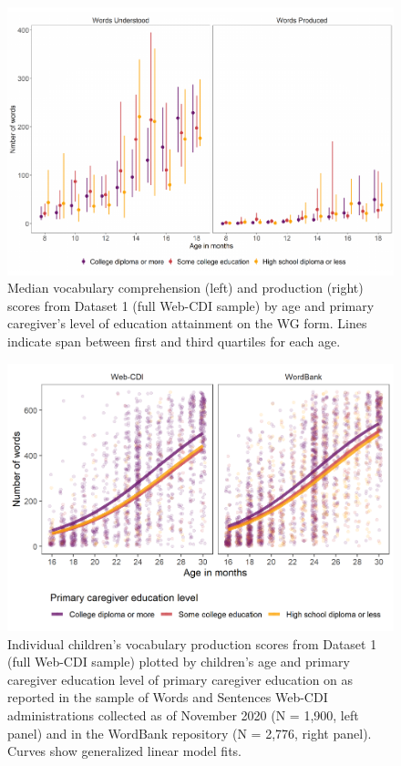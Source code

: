\documentclass[
  english,
  ,man,floatsintext]{apa6}
\begin{document}
\begin{figure}
\centering
\includegraphics{webcdi_paper_files/figure-latex/wgmedfig-1.pdf}
\caption{\label{fig:wgmedfig}Median vocabulary comprehension (left) and production (right) scores from Dataset 1 (full Web-CDI sample) by age and primary caregiver's level of education attainment on the WG form. Lines indicate span between first and third quartiles for each age.}
\end{figure}

\begin{figure}
\centering
\includegraphics{webcdi_paper_files/figure-latex/wsglm-1.pdf}
\caption{\label{fig:wsglm}Individual children's vocabulary production scores from Dataset 1 (full Web-CDI sample) plotted by children's age and primary caregiver education level of primary caregiver education on as reported in the sample of Words and Sentences Web-CDI administrations collected as of November 2020 (N = 1,900, left panel) and in the WordBank repository (N = 2,776, right panel). Curves show generalized linear model fits.}
\end{figure}
\end{document}
